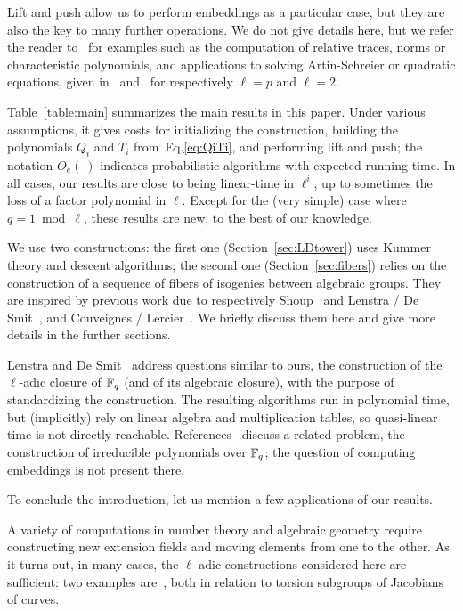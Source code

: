 \documentclass{sig-alternate}
\begin{document}
Lift and push allow us to perform embeddings as a particular case, but
they are also the key to many further operations. We do not give
details here, but we refer the reader
to~\cite{df+schost12,DoSc12,LeSc12} for examples such as the
computation of relative traces, norms or characteristic polynomials,
and applications to solving Artin-Schreier or quadratic equations,
given in~\cite{df+schost12} and~\cite{DoSc12} for respectively
$\ell=p$ and $\ell=2$.

Table~\ref{table:main} summarizes the main results in this paper.
Under various assumptions, it gives costs for initializing the
construction, building the polynomials $Q_i$ and $T_i$
from~Eq.\eqref{eq:QiTi}, and performing lift and push; the notation
$O_e(\ )$ indicates probabilistic algorithms with expected running
time. In all cases, our results are close to being linear-time in
$\ell^i$, up to sometimes the loss of a factor polynomial in $\ell$.
Except for the (very simple) case where $q=1 \bmod \ell$, these
results are new, to the best of our knowledge.

We use two constructions: the first one (Section~\ref{sec:LDtower})
uses Kummer theory and descent algorithms; the second one
(Section~\ref{sec:fibers}) relies on the construction of a sequence of
fibers of isogenies between algebraic groups. They are inspired by
previous work due to respectively Shoup~\cite{Shoup90,shoup94} and
Lenstra / De Smit~\cite{lenstra+desmit08-stdmodels}, and Couveignes /
Lercier~\cite{couveignes+lercier11}. We briefly discuss them here and
give more details in the further sections.

Lenstra and De Smit~\cite{lenstra+desmit08-stdmodels} address
questions similar to ours, the construction of the $\ell$-adic closure
of $\mathbb{F}_q$ (and of its algebraic closure), with the purpose of
standardizing the construction. The resulting algorithms run in
polynomial time, but (implicitly) rely on linear algebra and
multiplication tables, so quasi-linear time is not directly reachable.
References~\cite{Shoup90,shoup94,couveignes+lercier11} discuss a
related problem, the construction of irreducible polynomials over
$\mathbb{F}_q$; the question of computing embeddings is not present there.

To conclude the introduction, let us mention a few applications of our
results. 

A variety of computations in number theory and algebraic geometry
require constructing new extension fields and moving elements from one
to the other. As it turns out, in many cases, the $\ell$-adic
constructions considered here are sufficient: two examples
are~\cite{df10,GaSc12}, both in relation to torsion subgroups of
Jacobians of curves. 
\end{document}

